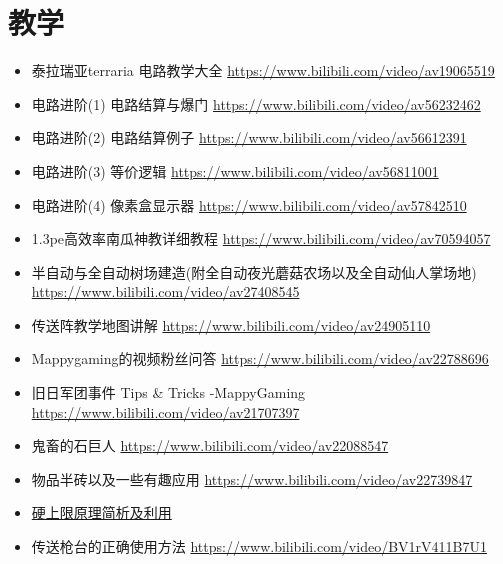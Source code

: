 \section{教学}
\begin{itemize}
\item 泰拉瑞亚terraria 电路教学大全 \url{https://www.bilibili.com/video/av19065519}
\item 电路进阶(1) 电路结算与爆门 \url{https://www.bilibili.com/video/av56232462}
\item 电路进阶(2) 电路结算例子 \url{https://www.bilibili.com/video/av56612391}
\item 电路进阶(3) 等价逻辑 \url{https://www.bilibili.com/video/av56811001}
\item 电路进阶(4) 像素盒显示器 \url{https://www.bilibili.com/video/av57842510}
\item 1.3pe高效率南瓜神教详细教程 \url{https://www.bilibili.com/video/av70594057}
\item 半自动与全自动树场建造(附全自动夜光蘑菇农场以及全自动仙人掌场地) \url{https://www.bilibili.com/video/av27408545}
\item 传送阵教学地图讲解 \url{https://www.bilibili.com/video/av24905110}
\item Mappygaming的视频粉丝问答 \url{https://www.bilibili.com/video/av22788696}
\item 旧日军团事件 Tips \& Tricks -MappyGaming \url{https://www.bilibili.com/video/av21707397}
\item 鬼畜的石巨人 \url{https://www.bilibili.com/video/av22088547}
\item 物品半砖以及一些有趣应用 \url{https://www.bilibili.com/video/av22739847}
\item \href{https://www.bilibili.com/video/BV1aa4y1t7VH?p=2}{硬上限原理简析及利用}
\item 传送枪台的正确使用方法 \url{https://www.bilibili.com/video/BV1rV411B7U1}
\end{itemize}

